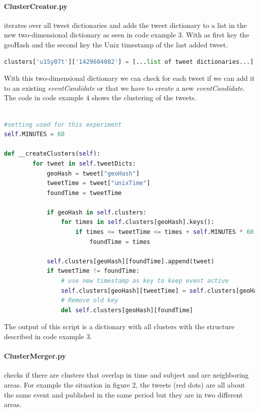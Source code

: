 \documentclass[
10pt, %
a4paper, %
oneside, %
headinclude,footinclude, %
BCOR5mm, %
]{scrartcl}
\begin{document}
\paragraph{ClusterCreator.py} iterates over all tweet dictionaries and adds the tweet dictionary to a list in the new two-dimensional dictionary as seen in code example 3. With as first key the geoHash and the second key the Unix timestamp of the last added tweet. 
\begin{lstlisting}[language=Python, caption=Result dictionary]
clusters['u15y07t']['1429604082'] = [...list of tweet dictionaries...]
\end{lstlisting}
With this two-dimensional dictionary we can check for each tweet if we can add it to an existing \textit{eventCandidate} or that we have to create a new \textit{eventCandidate}. The code in code example 4 shows the clustering of the tweets.
\begin{lstlisting}[language=Python, caption=Cluster tweets]

#setting used for this experiment
self.MINUTES = 60

def __createClusters(self):
        for tweet in self.tweetDicts:
            geoHash = tweet["geoHash"]
            tweetTime = tweet["unixTime"]
            foundTime = tweetTime

            if geoHash in self.clusters:
                for times in self.clusters[geoHash].keys():
                    if times <= tweetTime <= times + self.MINUTES * 60:
                        foundTime = times
            
            self.clusters[geoHash][foundTime].append(tweet)
            if tweetTime != foundTime:
                # use new timestamp as key to keep event active
                self.clusters[geoHash][tweetTime] = self.clusters[geoHash][foundTime]
                # Remove old key
                del self.clusters[geoHash][foundTime] 
\end{lstlisting}

The output of this script is a dictionary with all clusters with the structure described in code example 3.
\newpage
\paragraph{ClusterMerger.py} checks if there are clusters that overlap in time and subject and are neighboring areas. For example the situation in figure 2, the tweets (red dots) are all about the same event and published in the same period but they are in two different areas.  
\end{document}
